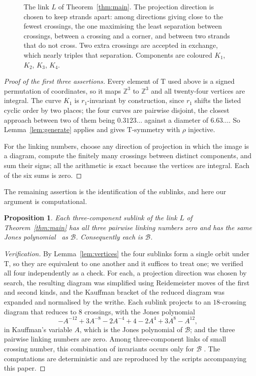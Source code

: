 \documentclass[11pt,a4paper]{article}
\theoremstyle{plain}
\newtheorem{proposition}[theorem]{Proposition}
\theoremstyle{definition}
\newcommand{\ZZ}{\mathbb{Z}}
\newcommand{\Tet}{\mathrm{T}}
\newcommand{\Bor}{\mathcal{B}}
\begin{document}
\begin{figure}[htbp]
\centering

\caption{The link $L$ of Theorem~\ref{thm:main}. The projection direction is
chosen to keep strands apart: among directions giving close to the fewest
crossings, the one maximising the least separation between crossings, between a
crossing and a corner, and between two strands that do not cross. Two extra
crossings are accepted in exchange, which nearly triples that separation.
Components are coloured \textcolor{ringA}{$K_1$}, \textcolor{ringB}{$K_2$},
\textcolor{ringC}{$K_3$}, \textcolor{ringD}{$K_4$}.}
\label{fig:link}
\end{figure}

\begin{proof}[Proof of the first three assertions]
Every element of $\Tet$ used above is a signed permutation of coordinates, so it
maps $\ZZ^3$ to $\ZZ^3$ and all twenty-four vertices are integral. The curve
$K_1$ is $r_1$-invariant by construction, since $r_1$ shifts the listed cyclic
order by two places; the four curves are pairwise disjoint, the closest approach
between two of them being $0.3123\ldots$ against a diameter of $6.63\ldots$. So
Lemma~\ref{lem:generate} applies and gives $\Tet$-symmetry with $\rho$
injective.

For the linking numbers, choose any direction of projection in which the image
is a diagram, compute the finitely many crossings between distinct components,
and sum their signs; all the arithmetic is exact because the vertices are
integral. Each of the six sums is zero.
\end{proof}

The remaining assertion is the identification of the sublinks, and here our
argument is computational.

\begin{proposition}\label{prop:sublinks}
Each three-component sublink of the link $L$ of Theorem~\ref{thm:main} has all
three pairwise linking numbers zero and has the same Jones
polynomial~\cite{jones1985,kauffman1987} as $\Bor$. Consequently each is
$\Bor$.
\end{proposition}

\begin{proof}[Verification]
By Lemma~\ref{lem:vertices} the four sublinks form a single orbit under $\Tet$,
so they are equivalent to one another and it suffices to treat one; we verified
all four independently as a check. For each, a projection direction was chosen
by search, the resulting diagram was simplified using Reidemeister moves of the
first and second kinds, and the Kauffman bracket of the reduced diagram was
expanded and normalised by the writhe. Each sublink projects to an
$18$-crossing diagram that reduces to $8$ crossings, with the Jones polynomial
\[
  -A^{-12}+3A^{-8}-2A^{-4}+4-2A^{4}+3A^{8}-A^{12},
\]
in Kauffman's variable $A$, which is the Jones polynomial of $\Bor$; and the
three pairwise linking numbers are zero. Among three-component links of small
crossing number, this combination of invariants occurs only for $\Bor$
\cite{linkinfo}. The computations are deterministic and are reproduced by the
scripts accompanying this paper.
\end{proof}
\end{document}

